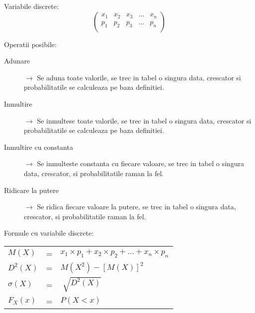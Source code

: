 \documentclass{article}
\begin{document}
Variabile discrete:
\[
  \begin{pmatrix}
    x_1 & x_2 & x_3 & \ldots & x_n \\
    p_1 & p_2 & p_3 & \ldots & p_n \\
  \end{pmatrix}
\]

Operatii posibile:
\begin{description}
  \item[Adunare] $\rightarrow$ Se aduna toate valorile, se trec in tabel o singura data, crescator si probabilitatile se calculeaza pe baza definitiei.
  \item[Inmultire] $\rightarrow$ Se inmultesc toate valorile, se trec in tabel o singura data, crescator si probabilitatile se calculeaza pe baza definitiei.
  \item[Inmultire cu constanta] $\rightarrow$ Se inmulteste constanta cu fiecare valoare, se trec in tabel o singura data, crescator, si probabilitatile raman la fel.
  \item[Ridicare la putere] $\rightarrow$ Se ridica fiecare valoare la putere, se trec in tabel o singura data, crescator, si probabilitatile raman la fel.
\end{description}

Formule cu variabile discrete:\\
\begin{tabular}{lll}
  $M(X)$      & = & $ x_1 \times p_1 + x_2 \times p_2 + \ldots + x_n \times p_n $ \\
  $D^2(X)$    & = & $ M(X^2) - [M(X)]^2 $                                         \\
  $\sigma(X)$ & = & $ \sqrt[]{D^2(X)} $                                           \\
  $F_X(x)$    & = & $ P(X < x) $                                                  \\
\end{tabular}
\end{document}
